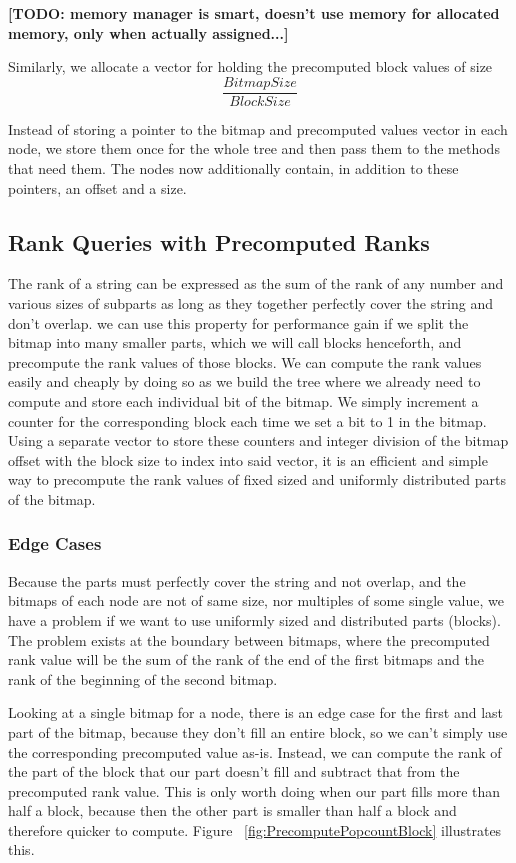 \textbf{[TODO: memory manager is smart, doesn't use memory for allocated memory, only when actually assigned...]}

Similarly, we allocate a vector for holding the precomputed block values of size
\[ \frac{BitmapSize}{BlockSize} \]

Instead of storing a pointer to the bitmap and precomputed values vector in each node, we store them once for the whole tree and then pass them to the methods that need them.
The nodes now additionally contain, in addition to these pointers, an offset and a size.


\subsection{Rank Queries with Precomputed Ranks}
The rank of a string can be expressed as the sum of the rank of any number and various sizes of subparts as long as they together perfectly cover the string and don't overlap.
we can use this property for performance gain if we split the bitmap into many smaller parts, which we will call blocks henceforth, and precompute the rank values of those blocks.
We can compute the rank values easily and cheaply by doing so as we build the tree where we already need to compute and store each individual bit of the bitmap.
We simply increment a counter for the corresponding block each time we set a bit to 1 in the bitmap.
Using a separate vector to store these counters and integer division of the bitmap offset with the block size to index into said vector, it is an efficient and simple way to precompute the rank values of fixed sized and uniformly distributed parts of the bitmap.


\subsubsection{Edge Cases}
\label{sec:rankQueriesWithPrecomputedRanksEdgeCases}
Because the parts must perfectly cover the string and not overlap, and the bitmaps of each node are not of same size, nor multiples of some single value, we have a problem if we want to use uniformly sized and distributed parts (blocks).
The problem exists at the boundary between bitmaps, where the precomputed rank value will be the sum of the rank of the end of the first bitmaps and the rank of the beginning of the second bitmap.

Looking at a single bitmap for a node, there is an edge case for the first and last part of the bitmap, because they don't fill an entire block, so we can't simply use the corresponding precomputed value as-is.
Instead, we can compute the rank of the part of the block that our part doesn't fill and subtract that from the precomputed rank value.
This is only worth doing when our part fills more than half a block, because then the other part is smaller than half a block and therefore quicker to compute.
Figure ~\ref{fig:PrecomputePopcountBlock} illustrates this.

